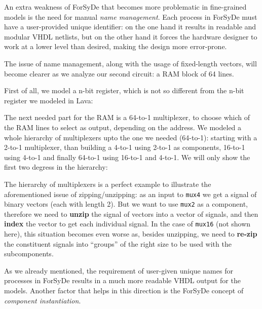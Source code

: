\documentclass[a4paper]{article}
\begin{document}
                An extra weakness of ForSyDe that becomes more problematic in fine-grained models is
                the need for manual \emph{name management}. Each process in ForSyDe must have a
                user-provided unique identifier: on the one hand it results in readable and modular
                VHDL netlists, but on the other hand it forces the hardware designer to work at a
                lower level than desired, making the design more error-prone.

                The issue of name management, along with the usage of fixed-length vectors, will
                become clearer as we analyze our second circuit: a RAM block of 64 lines.

                First of all, we model a n-bit register, which is not so different from the n-bit
                register we modeled in Lava:


                The next needed part for the RAM is a 64-to-1 multiplexer, to choose which of the
                RAM lines to select as output, depending on the address. We modeled a whole
                hierarchy of multiplexers upto the one we needed (64-to-1): starting with a 2-to-1
                multiplexer, than building a 4-to-1 using 2-to-1 as components, 16-to-1 using 4-to-1
                and finally 64-to-1 using 16-to-1 and 4-to-1. We will only show the first two
                degress in the hierarchy:


                The hierarchy of multiplexers is a perfect example to illustrate the aforementioned
                issue of zipping/unzipping: as an input to \texttt{mux4} we get a signal of binary
                vectors (each with length 2). But we want to use \texttt{mux2} as a component,
                therefore we need to \textbf{unzip} the signal of vectors into a vector of signals,
                and then \textbf{index} the vector to get each individual signal. In the case of
                \texttt{mux16} (not shown here), this situation becomes even worse as, besides
                unzipping, we need to \textbf{re-zip} the constituent signals into ``groups'' of the
                right size to be used with the subcomponents.

                As we already mentioned, the requirement of user-given unique names for processes in
                ForSyDe results in a much more readable VHDL output for the models. Another factor
                that helps in this direction is the ForSyDe concept of \emph{component
                    instantiation}.
\end{document}
